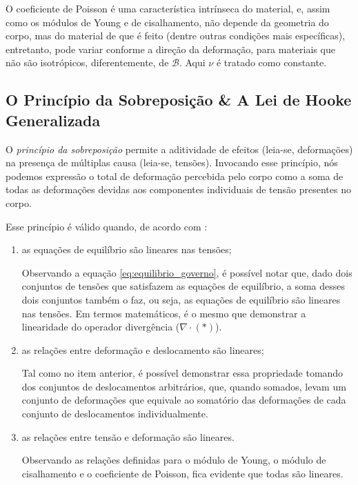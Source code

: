 O coeficiente de Poisson é uma característica intrínseca do material, e, assim como os módulos de Young e de cisalhamento, não depende da geometria do corpo, mas do material de que é feito (dentre outras condições mais específicas), entretanto, pode variar conforme a direção da deformação, para materiais que não são isotrópicos, diferentemente, de $\mathcal{B}$. Aqui $\nu$ é tratado como constante.

\subsection{O Princípio da Sobreposição \& A Lei de Hooke Generalizada}

\begin{citacao}
    O \emph{princípio da sobreposição} permite a aditividade de efeitos (leia-se, deformações) na presença de múltiplas causa (leia-se, tensões). Invocando esse princípio, nós podemos expressão o total de deformação percebida pelo corpo como a soma de todas as deformações devidas aos componentes individuais de tensão presentes no corpo. \cite[pág. 252, tradução livre]{lub}
\end{citacao}

Esse princípio é válido quando, de acordo com \cite{lub}:
\begin{enumerate}
    \item as equações de equilíbrio são lineares nas tensões;
        
    Observando a equação \ref{eq:equilibrio_governo}, é possível notar que, dado dois conjuntos de tensões que satisfazem as equações de equilíbrio, a soma desses dois conjuntos também o faz, ou seja, as equações de equilíbrio são lineares nas tensões. Em termos matemáticos, é o mesmo que demonstrar a linearidade do operador divergência ($\nabla \cdot (*)$).
    \item as relações entre deformação e deslocamento são lineares;
        
    Tal como no item anterior, é possível demonstrar essa propriedade tomando dos conjuntos de deslocamentos arbitrários, que, quando somados, levam um conjunto de deformações que equivale ao somatório das deformações de cada conjunto de deslocamentos individualmente.
    \item as relações entre tensão e deformação são lineares.
        
    Observando as relações definidas para o módulo de Young, o módulo de cisalhamento e o coeficiente de Poisson, fica evidente que todas são lineares.
\end{enumerate}

